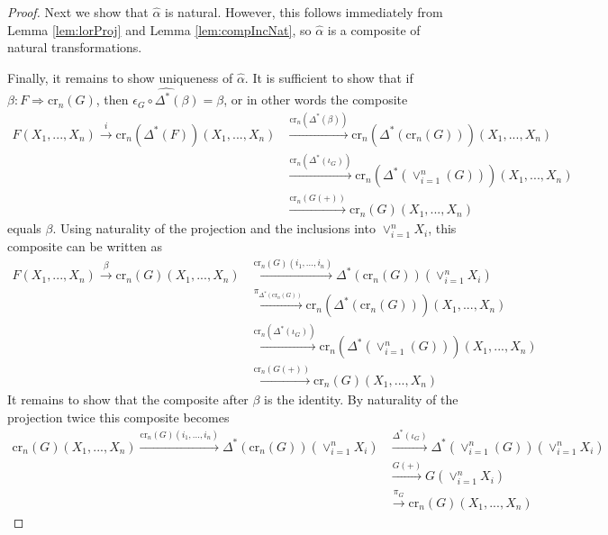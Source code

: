 \begin{proof}
    \vspace{10pt}

    Next we show that $\hat{\alpha}$ is natural. However, this follows immediately from Lemma \ref{lem:lorProj} and Lemma \ref{lem:compIncNat}, so $\hat{\alpha}$ is a composite of natural transformations.

    \vspace{10pt}

    Finally, it remains to show uniqueness of $\hat{\alpha}$. It is sufficient to show that if $\beta:F\Rightarrow \text{cr}_n(G)$, then $\widehat{\epsilon_G\circ \Delta^*(\beta)} = \beta$, or in other words the composite
    \begin{align*}
        F(X_1,...,X_n)\xrightarrow{i}\text{cr}_n(\Delta^*(F))(X_1,...,X_n)&\xrightarrow{\text{cr}_n(\Delta^*(\beta))}\text{cr}_n(\Delta^*(\text{cr}_n(G)))(X_1,...,X_n)\\
        &\xrightarrow{\text{cr}_n(\Delta^*(\iota_G))}\text{cr}_n(\Delta^*(\lor_{i=1}^n(G)))(X_1,...,X_n)\\
        &\xrightarrow{\text{cr}_n(G(+))}\text{cr}_n(G)(X_1,...,X_n)
    \end{align*}
    equals $\beta$. Using naturality of the projection and the inclusions into $\lor_{i=1}^nX_i$, this composite can be written as 
    \begin{align*}
        F(X_1,...,X_n)\xrightarrow{\beta}\text{cr}_n(G)(X_1,...,X_n)&\xrightarrow{\text{cr}_n(G)(i_1,...,i_n)}\Delta^*(\text{cr}_n(G))(\lor_{i=1}^nX_i) \\
        &\xrightarrow{\pi_{\Delta^*(\text{cr}_n(G))}}\text{cr}_n(\Delta^*(\text{cr}_n(G)))(X_1,...,X_n) \\
        &\xrightarrow{\text{cr}_n(\Delta^*(\iota_G))}\text{cr}_n(\Delta^*(\lor_{i=1}^n(G)))(X_1,...,X_n) \\
        &\xrightarrow{\text{cr}_n(G(+))}\text{cr}_n(G)(X_1,...,X_n)
    \end{align*}
    It remains to show that the composite after $\beta$ is the identity. By naturality of the projection twice this composite becomes
    \begin{align*}
        \text{cr}_n(G)(X_1,...,X_n)\xrightarrow{\text{cr}_n(G)(i_1,...,i_n)}\Delta^*(\text{cr}_n(G))(\lor_{i=1}^nX_i) &\xrightarrow{\Delta^*(\iota_G)}\Delta^*(\lor_{i=1}^n(G))(\lor_{i=1}^nX_i) \\
        &\xrightarrow{G(+)}G(\lor_{i=1}^nX_i) \\
        &\xrightarrow{\pi_G}\text{cr}_n(G)(X_1,...,X_n)

\end{align*}
\end{proof}
